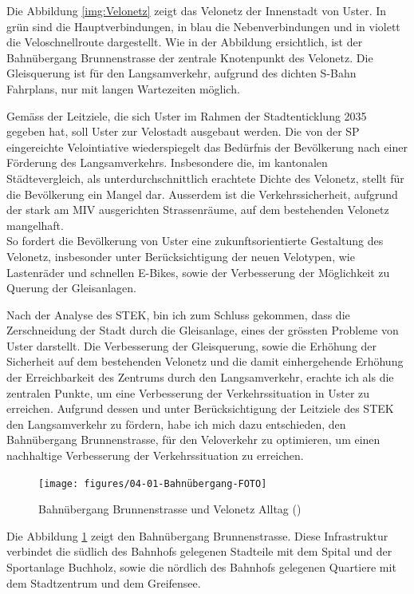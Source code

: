 Die Abbildung \ref{img:Velonetz} zeigt das Velonetz der Innenstadt von Uster. In grün sind die Hauptverbindungen, in blau die Nebenverbindungen und in violett die Veloschnellroute dargestellt. Wie in der Abbildung ersichtlich, ist der Bahnübergang Brunnenstrasse der zentrale Knotenpunkt des Velonetz. Die Gleisquerung ist für den Langsamverkehr, aufgrund des dichten S-Bahn Fahrplans, nur mit langen Wartezeiten möglich. 

Gemäss der Leitziele, die sich Uster im Rahmen der Stadtenticklung 2035 gegeben hat, soll Uster zur Velostadt ausgebaut werden. Die von der SP eingereichte Velointiative wiederspiegelt das Bedürfnis der Bevölkerung nach einer Förderung des Langsamverkehrs. Insbesondere die, im kantonalen Städtevergleich, als unterdurchschnittlich erachtete Dichte des Velonetz, stellt für die Bevölkerung ein Mangel dar. Ausserdem ist die Verkehrssicherheit, aufgrund der stark am MIV ausgerichten Strassenräume, auf dem bestehenden Velonetz mangelhaft. \\
So fordert die Bevölkerung von Uster eine zukunftsorientierte Gestaltung des Velonetz, insbesonder unter Berücksichtigung der neuen Velotypen, wie Lastenräder und schnellen E-Bikes, sowie der Verbesserung der Möglichkeit zu Querung der Gleisanlagen. 

Nach der Analyse des STEK, bin ich zum Schluss gekommen, dass die Zerschneidung der Stadt durch die Gleisanlage, eines der grössten Probleme von Uster darstellt. Die Verbesserung der Gleisquerung, sowie die Erhöhung der Sicherheit auf dem bestehenden Velonetz und die damit einhergehende Erhöhung der Erreichbarkeit des Zentrums durch den Langsamverkehr, erachte ich als die zentralen Punkte, um eine Verbesserung der Verkehrssituation in Uster zu erreichen. Aufgrund dessen und unter Berücksichtigung der Leitziele des STEK den Langsamverkehr zu fördern, habe ich mich dazu entschieden, den Bahnübergang Brunnenstrasse, für den Veloverkehr zu optimieren, um einen nachhaltige Verbesserung der Verkehrssituation zu erreichen. 

\begin{figure}[h!]
	\centering
	\texttt{[image: figures/04-01-Bahnübergang-FOTO]}
	\caption[Bahnübergang Brunnenstrasse]{Bahnübergang Brunnenstrasse und Velonetz Alltag (\cite{GIS})}
	\label{img:Brunnenstrasse}
\end{figure}

Die Abbildung \ref{img:Brunnenstrasse} zeigt den Bahnübergang Brunnenstrasse. Diese Infrastruktur verbindet die südlich des Bahnhofs gelegenen Stadteile mit dem Spital und der Sportanlage Buchholz, sowie die nördlich des Bahnhofs gelegenen Quartiere mit dem Stadtzentrum und dem Greifensee. 

